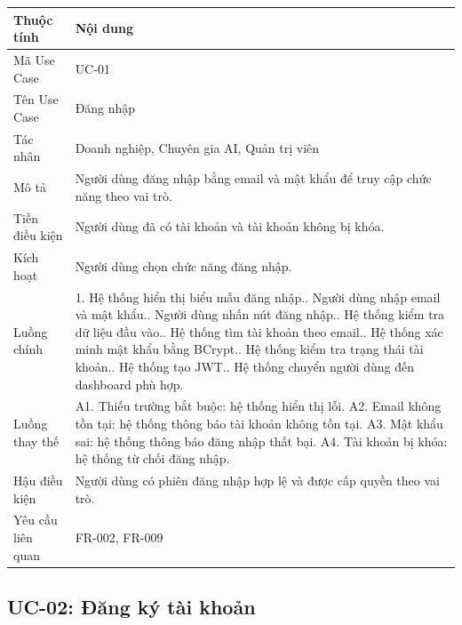 \begin{longtable}{|p{3.5cm}|p{10.2cm}|}
\hline
\textbf{Thuộc tính} & \textbf{Nội dung} \\ \hline
Mã Use Case & UC-01 \\ \hline
Tên Use Case & Đăng nhập \\ \hline
Tác nhân & Doanh nghiệp, Chuyên gia AI, Quản trị viên \\ \hline
Mô tả & Người dùng đăng nhập bằng email và mật khẩu để truy cập chức năng theo vai trò. \\ \hline
Tiền điều kiện & Người dùng đã có tài khoản và tài khoản không bị khóa. \\ \hline
Kích hoạt & Người dùng chọn chức năng đăng nhập. \\ \hline
Luồng chính &
1. Hệ thống hiển thị biểu mẫu đăng nhập.\newline
2. Người dùng nhập email và mật khẩu.\newline
3. Người dùng nhấn nút đăng nhập.\newline
4. Hệ thống kiểm tra dữ liệu đầu vào.\newline
5. Hệ thống tìm tài khoản theo email.\newline
6. Hệ thống xác minh mật khẩu bằng BCrypt.\newline
7. Hệ thống kiểm tra trạng thái tài khoản.\newline
8. Hệ thống tạo JWT.\newline
9. Hệ thống chuyển người dùng đến dashboard phù hợp. \\ \hline
Luồng thay thế &
A1. Thiếu trường bắt buộc: hệ thống hiển thị lỗi.\newline
A2. Email không tồn tại: hệ thống thông báo tài khoản không tồn tại.\newline
A3. Mật khẩu sai: hệ thống thông báo đăng nhập thất bại.\newline
A4. Tài khoản bị khóa: hệ thống từ chối đăng nhập. \\ \hline
Hậu điều kiện & Người dùng có phiên đăng nhập hợp lệ và được cấp quyền theo vai trò. \\ \hline
Yêu cầu liên quan & FR-002, FR-009 \\ \hline
\end{longtable}

\subsection{UC-02: Đăng ký tài khoản}

